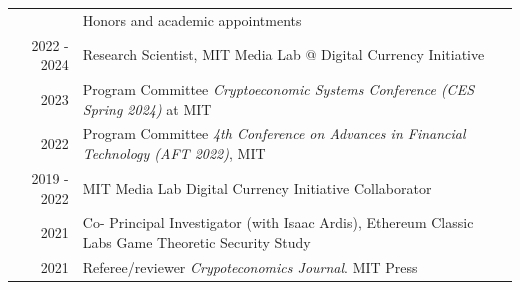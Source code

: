 \documentclass[letterpaper, 11pt]{article}
\newcommand{\headingfont}{\Large\color{OliveGreen}}
\newenvironment{SectionTableSingleSpace}[1]{
	\renewcommand*{\arraystretch}{1.2}
	\setlength{\tabcolsep}{10pt}
	\begin{longtable}{Rp{5.2in}} & #1 \\[0.6em]}
{\end{longtable}\vspace{-.3cm}}
\begin{document}

\begin{SectionTableSingleSpace}{\headingfont Honors and academic appointments}

2022 - 2024 &

Research Scientist, MIT Media Lab @ Digital Currency Initiative\\


2023 &

Program Committee \textit{Cryptoeconomic Systems Conference (CES Spring 2024)} at MIT\\


2022 &
Program Committee \textit{4th Conference on  Advances in Financial Technology (AFT 2022)}, MIT\\

2019 - 2022 & 
MIT Media Lab Digital Currency Initiative Collaborator\newline \\

2021 &

Co- Principal Investigator (with Isaac Ardis), Ethereum Classic Labs Game Theoretic Security Study \\

2021 &

Referee/reviewer \textit{Crypoteconomics Journal}. MIT Press\\

\end{SectionTableSingleSpace}



\end{document}
